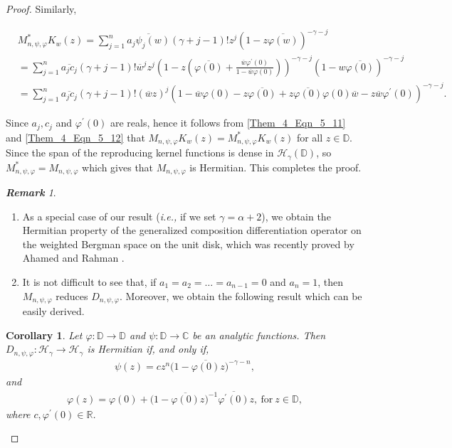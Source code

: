 \documentclass[12pt, reqno]{amsart}
\newtheorem{corollary}[theorem]{Corollary}
\theoremstyle{definition}
\theoremstyle{remark}
\newtheorem{remark}[theorem]{\bf{Remark}}
\numberwithin{equation}{section}
\begin{document}
\begin{proof}
	Similarly,
		
	\begin{align}\label{Them_4_Eqn_5_12}
	& M_{n,\psi, \varphi}^*K_w(z)
	=\displaystyle\sum_{j=1}^{n}\overline{a_j\psi_j(w)}(\gamma+j-1)! z^{j}(1-z\overline{\varphi(w)})^{-\gamma-j}\nonumber\\
	&=\displaystyle\sum_{j=1}^{n}\overline{a_jc_j}(\gamma+j-1)!\overline{w}^jz^{j}\left(1-z\left(\overline{\varphi(0)}+\frac{\overline{w}\varphi^\prime(0)}{1-\overline{w}\varphi(0)}\right)\right)^{-\gamma-j}(1- w\overline{\varphi(0)})^{-\gamma-j}\nonumber\\
	&=\displaystyle\sum_{j=1}^{n}\overline{a_jc_j}(\gamma+j-1)!(\overline{w}z)^{j}\left(1-\overline{w}\varphi(0)-z\overline{\varphi(0)}+z\overline{\varphi(0)}\varphi(0)\overline{w}-z\overline{w}\varphi^\prime(0)\right)^{-\gamma-j}.
	\end{align}

Since $a_j, c_j$ and $\varphi^\prime(0)$ are reals, hence it follows from \eqref{Them_4_Eqn_5_11} and \eqref{Them_4_Eqn_5_12} that $M_{n,\psi, \varphi}K_w(z)
	= M_{n,\psi, \varphi}^*K_w(z)$ for all $z\in \mathbb{D}$. Since the span of the reproducing kernel functions is dense in $\mathcal{H}_\gamma(\mathbb{D})$, so $M_{n,\psi, \varphi}^*= M_{n,\psi, \varphi}$ which gives that $M_{n,\psi, \varphi}$ is Hermitian. This completes the proof.
\begin{remark}
		\begin{enumerate}
			\item[(i)] 	As a special case of our result ({\it i.e.,} if we set $\gamma=\alpha+2$), we obtain the Hermitian property of the generalized composition differentiation operator on the weighted Bergman space on the unit disk, which was recently proved by Ahamed and Rahman \cite[Theorem 2.3]{Ahamed_Rahman_2023}.
			\item[(ii)] It is not difficult to see that, if $a_1=a_2=\dots=a_{n-1}=0$ and $a_n=1$, then $M_{n,\psi,\varphi}$ reduces $D_{n,\psi,\varphi}$. Moreover, we obtain the following result which can be easily derived.
		\end{enumerate}
		\end{remark}
	
	\begin{corollary}\label{Cor_3.6_1}\cite[Theorem 4.1]{Lo_Loh_JMAA_2023}
		Let $\varphi: \mathbb{D}\longrightarrow \mathbb{D}$ and $\psi:\mathbb{D}\longrightarrow \mathbb{C} $ be an analytic functions. Then $D_{n,\psi,\varphi}:\mathcal{H}_\gamma\rightarrow \mathcal{H}_\gamma$ is Hermitian if, and only if,
		\begin{gather*}
		\psi(z)=cz^{n}\big(1-\overline{\varphi(0)} z\big)^{-\gamma-n},
		\end{gather*}
		and 
		\begin{gather*}
		\varphi(z)=\varphi(0)+\big(1-\overline{\varphi(0)} z\big)^{-1}\overline{\varphi^{\prime}(0)}z,~ \mbox{for}~ z\in \mathbb{D},
		\end{gather*}
where	$c, \varphi^\prime(0)\in \mathbb{R}$.
	\end{corollary}

	
\end{proof}
\end{document}
